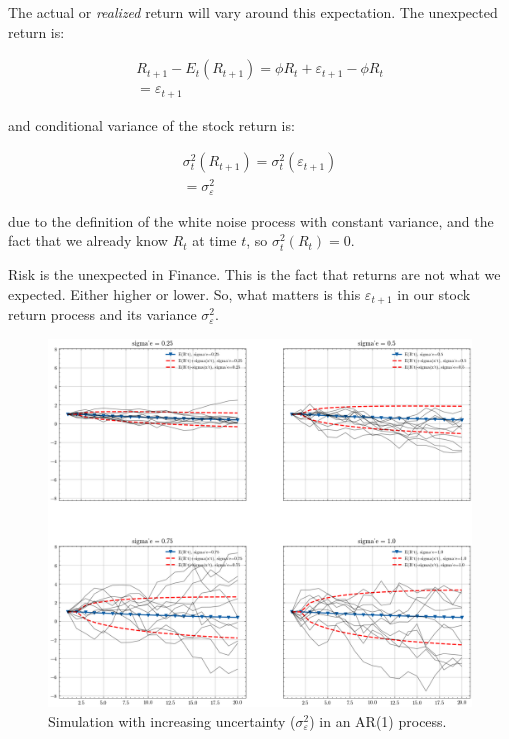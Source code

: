 The actual or \textit{realized} return will vary 
around this expectation. The unexpected return is:

\begin{equation}
    \begin{aligned}
    R_{t+1} - E_t(R_{t+1}) = \phi R_t + \varepsilon_{t+1} - \phi R_t \\
    = \varepsilon_{t+1}
    \end{aligned}
\end{equation}

and conditional variance of the stock return is:

\begin{equation}
    \begin{aligned}
    \sigma_t^2(R_{t+1}) = \sigma^2_t(\varepsilon_{t+1}) \\
    = \sigma_{\varepsilon}^2
    \end{aligned}
\end{equation}

due to the definition of the white noise 
process with constant variance, and the fact that
we already know $R_t$ at time $t$, so 
$\sigma_t^2(R_{t}) = 0$.

Risk is the unexpected in Finance. This 
is the fact that returns are not 
what we expected. Either higher or lower.
So, what matters is this $\varepsilon_{t+1}$ in 
our stock return process and its variance $\sigma_{\varepsilon}^2$.

\begin{figure}[htbp]
    \centering
    \includegraphics[width=1\textwidth]{../images/chapter01/ar_1.png}
    \caption{Simulation with increasing 
    uncertainty ($\sigma_{\varepsilon}^2$) in an AR(1) process.}
    \label{fig:fig01}
\end{figure}

